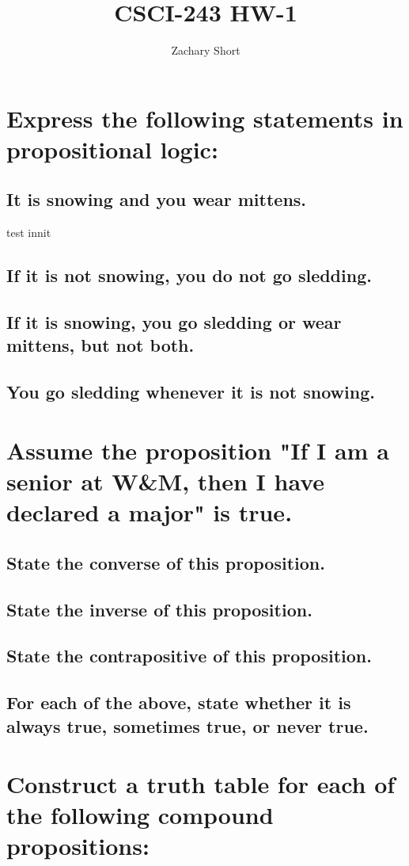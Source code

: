 \documentclass{article}
\title{CSCI-243 HW-1}
\author{Zachary Short}
\begin{document}
\maketitle

\section{Express the following statements in propositional logic:}
    \subsection{It is snowing and you wear mittens.} test innit
    \subsection{If it is not snowing, you do not go sledding.} 
    \subsection{If it is snowing, you go sledding or wear mittens, but not both.}
    \subsection{You go sledding whenever it is not snowing.}
\section{Assume the proposition "If I am a senior at W&M, then I have declared a major" is true.}
    \subsection{State the converse of this proposition.} 
    \subsection{State the inverse of this proposition.} 
    \subsection{State the contrapositive of this proposition.} 
    \subsection{For each of the above, state whether it is always true, sometimes true, or never true.} 
\section{Construct a truth table for each of the following compound propositions:}
\end{document}
